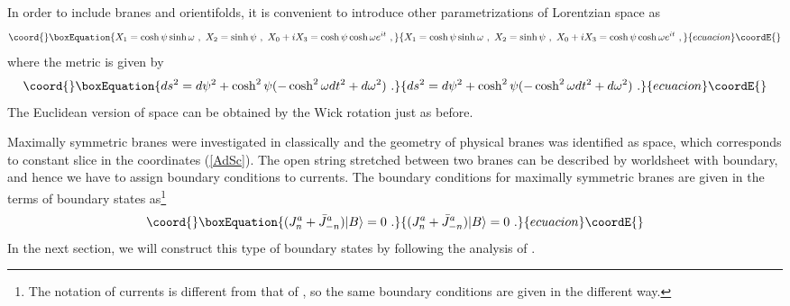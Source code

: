 \documentclass[a4paper,12pt]{article}
\providecommand{\ket}[1]{{|#1\rangle}{}}
\begin{document}
In order to include branes and orientifolds, 
it is convenient to introduce other parametrizations of Lorentzian
\coordHE{} space as 
\begin{equation}\coord{}\boxEquation{
 X_1 = \cosh \psi \sinh \omega ~, ~
 X_2 = \sinh \psi ~,~
 X_0 + i X_3 = \cosh \psi \cosh \omega e^{i t} ~,
\label{AdSc}
}{
 X_1 = \cosh \psi \sinh \omega ~, ~
 X_2 = \sinh \psi ~,~
 X_0 + i X_3 = \cosh \psi \cosh \omega e^{i t} ~,
}{ecuacion}\coordE{}\end{equation}
where the metric is given by
\begin{equation}\coord{}\boxEquation{
 ds^2 = d \psi ^2 + \cosh ^2 \psi ( - \cosh^2 \omega dt^2 + d \omega ^2)~.
}{
 ds^2 = d \psi ^2 + \cosh ^2 \psi ( - \cosh^2 \omega dt^2 + d \omega ^2)~.
}{ecuacion}\coordE{}\end{equation}
The Euclidean version of \coordHE{} space can be obtained by the Wick
rotation \coordHE{} just as before. 


Maximally symmetric branes were
investigated in \cite{Stan2,Stan3,BP} classically and the geometry of
physical branes was identified as \coordHE{} space, which corresponds to 
constant \myHighlight{$\psi$}\coordHE{} slice in the coordinates (\ref{AdSc}).
The open string stretched between two branes can be described by
worldsheet with boundary, and hence we have to assign boundary
conditions to currents. 
The boundary conditions for maximally symmetric branes are given in the
terms of boundary states
as\footnote{
The notation of currents is different from
that of \cite{HS}, so the same boundary conditions are given in the
different way.
}
\begin{equation}\coord{}\boxEquation{
 (J^a_n + \bar{J}^a_{-n}) \ket{B} = 0 ~.
\label{BS}
}{
 (J^a_n + \bar{J}^a_{-n}) \ket{B} = 0 ~.
}{ecuacion}\coordE{}\end{equation}
In the next section, we will construct this type of boundary states by
following the analysis of \cite{LOP,PST}.
\end{document}
